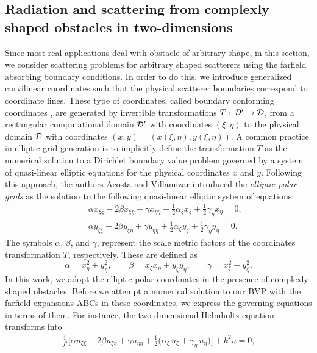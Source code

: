 \documentclass[final,3p,times,12pt]{elsarticle}
\begin{document}
\subsection{ Radiation and scattering from complexly shaped obstacles in two-dimensions}\label{ScattComplex}
Since most real applications deal with obstacle of arbitrary shape, in this section, we consider scattering problems for arbitrary shaped scatterers using the farfield absorbing boundary conditions. In order to do this,  we introduce
generalized curvilinear coordinates such that the physical
scatterer boundaries correspond to coordinate lines. These type of
coordinates, called boundary conforming coordinates
\cite{Steinberg}, are generated by invertible transformations $
T:\thinspace \mathcal{D^{\prime}}\rightarrow \mathcal{D}$, from a
rectangular computational domain ${\cal D^{\prime}}$ with
coordinates $(\xi,\eta)$ to the physical domain ${\cal D}$ with
coordinates $(x,y)=(x(\xi,\eta),y(\xi,\eta))$. A common practice in elliptic grid generation is
to implicitly define the transformation $T$ as the numerical
solution to a Dirichlet boundary value problem governed by a system of quasi-linear elliptic equations
for the physical coordinates $x$ and
$y.$ Following this approach, the authors Acosta and Villamizar \cite{JCP2010} introduced the {\it elliptic-polar grids}
as the solution to the following quasi-linear  elliptic system of equations:
\begin{eqnarray}
&& \alpha x_{\xi \xi }-2\beta x_{\xi \eta}+\gamma x_{\eta \eta } +
\frac{1}{2} \alpha_{\xi}x_{\xi} + \frac{1}{2}
\gamma_{\eta}x_{\eta} = 0, \label{Elliptic3} \\
&& \alpha y_{\xi \xi }-2\beta y_{\xi \eta}+\gamma y_{\eta \eta } +
\frac{1}{2} \alpha_{\xi}y_{\xi} + \frac{1}{2} \gamma_{\eta}y_{\eta} = 0.
\label{Elliptic4}
\end{eqnarray}
The symbols $\alpha$, $\beta$, and $\gamma$,
represent the scale metric factors of the
coordinates transformation $T$, respectively. These are defined as
$$\alpha =x_{\eta }^{2}+y_{\eta }^{2}, \qquad
\beta =x_{\xi }x_{\eta }+y_{\xi }y_{\eta }, \qquad \gamma=x_{\xi
}^{2}+y_{\xi }^{2}.
$$
In this work, we adopt the elliptic-polar coordinates in the presence of complexly shaped obstacles. Before we attempt a numerical solution to our BVP with the farfield expansions ABCs in 
these coordinates, we express the governing equations in terms of them. For instance, the two-dimensional 
Helmholtz equation transforms into
\begin{eqnarray} \frac{1}{J^2} \Bigg[\alpha u_{\xi \xi
}-2\beta u_{\xi \eta}+\gamma u_{\eta \eta } +
\frac{1}{2}
\Big(\alpha_{\xi}\,u_{\xi}+\gamma_{\eta}\,u_{\eta}\Big)\Bigg]
+ k^2 u = 0, \label{HelmElliptic}
\end{eqnarray}
\end{document}
